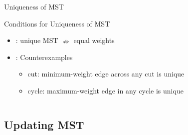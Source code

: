 \begin{frame}{Uniqueness of MST}
  \begin{block}{Conditions for Uniqueness of MST }
    \begin{itemize}
      \item {}: unique MST $\nRightarrow$ equal weights
      \item {}: Counterexamples
        \begin{itemize}
          \item \xmark cut: minimum-weight edge across any cut is unique
          \item \xmark cycle: maximum-weight edge in any cycle is unique
        \end{itemize}
        \begin{columns}
        \end{columns}
    \end{itemize}
  \end{block}
\end{frame}
\subsection{Updating MST}

